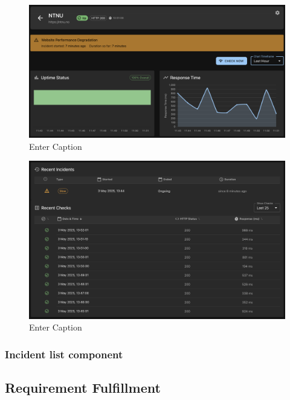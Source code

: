 \begin{figure}[H]
    \centering
    \includegraphics[width=1\linewidth]{figures/websiteDetails.png}
    \caption{Enter Caption}
    \label{fig:enter-label}
\end{figure}


\begin{figure}[H]
    \centering
    \includegraphics[width=1\linewidth]{figures/websiteDetails_bottom.png}
    \caption{Enter Caption}
    \label{fig:enter-label}
\end{figure}


\subsubsection{Incident list component}



\subsection{Requirement Fulfillment}

